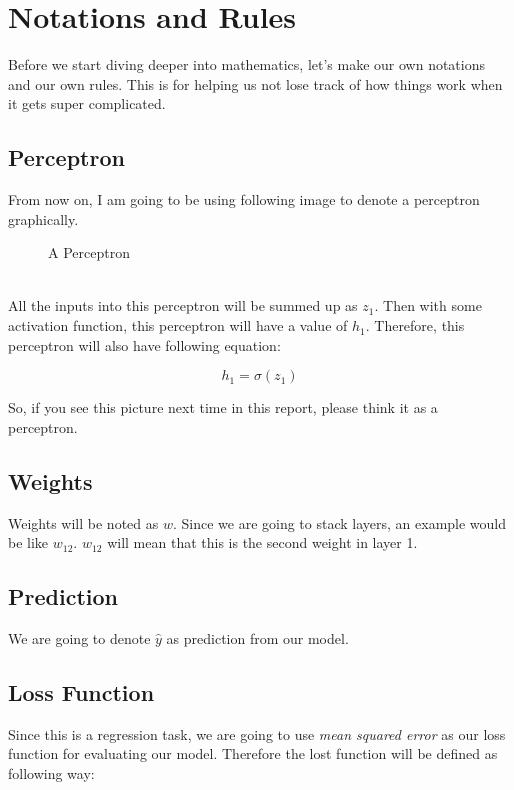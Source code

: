 \documentclass{homework}
\begin{document}
\pagebreak

\section{Notations and Rules}
Before we start diving deeper into mathematics, let's make our own notations and our own rules. This is for helping us not lose track of how things work when it gets super complicated.

\subsection{Perceptron}
From now on, I am going to be using following image to denote a perceptron graphically.

\begin{figure}[h]
    \centering
    \caption{A Perceptron}
    \label{fig:my_label}
\end{figure}
\\
All the inputs into this perceptron will be summed up as $z_1$. Then with some activation function, this perceptron will have a value of $h_1$. Therefore, this perceptron will also have following equation:

\[
    h_1 = \sigma(z_1)
\]

So, if you see this picture next time in this report, please think it as a perceptron.

\subsection{Weights}
Weights will be noted as $w$. Since we are going to stack layers, an example would be like $w_{12}$. $w_{12}$ will mean that this is the second weight in layer 1.

\subsection{Prediction}
We are going to denote $\hat{y}$ as prediction from our model.

\subsection{Loss Function}
Since this is a regression task, we are going to use \textit{mean squared error} as our loss function for evaluating our model. Therefore the lost function will be defined as following way:
\end{document}
